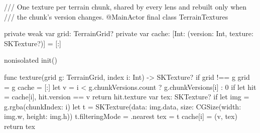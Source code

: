 /// One texture per terrain chunk, shared by every lens and rebuilt only when
/// the chunk's version changes.
@MainActor
final class TerrainTextures {
    private weak var grid: TerrainGrid?
    private var cache: [Int: (version: Int, texture: SKTexture?)] = [:]

    nonisolated init() {}

    func texture(grid g: TerrainGrid, index i: Int) -> SKTexture? {
        if grid !== g {
            grid = g
            cache = [:]
        }
        let v = i < g.chunkVersions.count ? g.chunkVersions[i] : 0
        if let hit = cache[i], hit.version == v { return hit.texture }
        var tex: SKTexture?
        if let img = g.rgba(chunkIndex: i) {
            let t = SKTexture(data: img.data, size: CGSize(width: img.w, height: img.h))
            t.filteringMode = .nearest
            tex = t
        }
        cache[i] = (v, tex)
        return tex
    }
}

